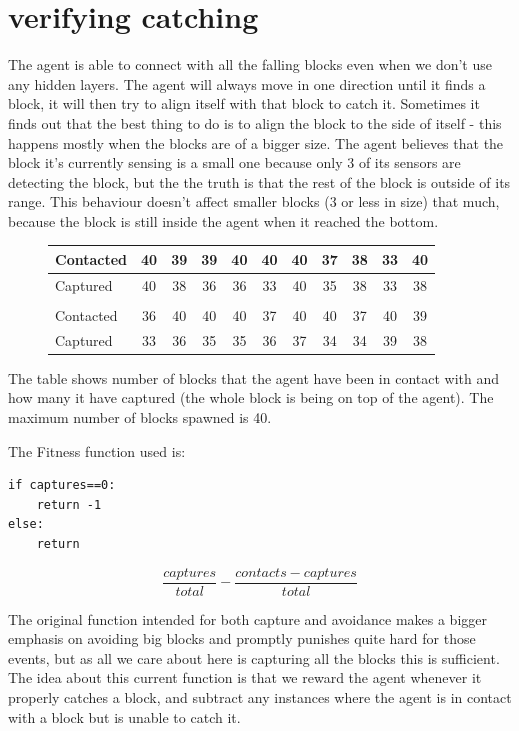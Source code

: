\documentclass[12pt, a4paper]{article}
\begin{document}
\section{verifying catching}

The agent is able to connect with all the falling blocks even when we don't use any hidden layers. The agent will always move in one direction until it finds a block, it will then try to align itself with that block to catch it. Sometimes it finds out that the best thing to do is to align the block to the side of itself - this happens mostly when the blocks are of a bigger size. The agent believes that the block it's currently sensing is a small one because only 3 of its sensors are detecting the block, but the the truth is that the rest of the block is outside of its range. This behaviour doesn't affect smaller blocks (3 or less in size) that much, because the block is still inside the agent when it reached the bottom.

\begin{figure}[H]
	\begin{center}
		\begin{tabular}{l | c | c |c |c |c |c |c |c|c|c}
		 Contacted& 40&39&39&40&40&40&37&38&33&40\\ \hline
		 Captured & 40&38&36&36&33&40&35&38&33&38\\
		 \\
		 Contacted &36&40&40&40&37&40&40&37&40&39\\ \hline
		 Captured &33&36&35&35&36&37&34&34&39&38\\

		\end{tabular}
	\end{center}
\end{figure}
The table shows number of blocks that the agent have been in contact with and how many it have captured (the whole block is being on top of the agent). The maximum number of blocks spawned is 40.

The Fitness function used is: 
\begin{verbatim}
if captures==0:
    return -1
else:
    return
	\end{verbatim}
    $$\frac{captures}{total}-\frac{contacts-captures}{total}$$

The original function intended for both capture and avoidance makes a bigger emphasis on avoiding big blocks and promptly punishes quite hard for those events, but as all we care about here is capturing all the blocks this is sufficient. The idea about this current function is that we reward the agent whenever it properly catches a block, and subtract any instances where the agent is in contact with a block but is unable to catch it. 
\end{document}
